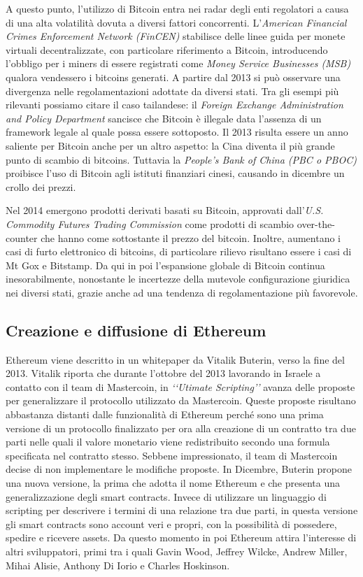 A questo punto, l'utilizzo di Bitcoin entra nei radar degli enti regolatori a causa di una alta volatilità dovuta a diversi fattori concorrenti. L'\textit{American Financial Crimes Enforcement Network (FinCEN)} stabilisce delle linee guida per monete virtuali decentralizzate, con particolare riferimento a Bitcoin, introducendo l'obbligo per i miners di essere registrati come \textit{Money Service Businesses (MSB)} qualora vendessero i bitcoins generati\cite{K17}. A partire dal 2013 si può osservare una divergenza nelle regolamentazioni adottate da diversi stati. 
Tra gli esempi più rilevanti possiamo citare il caso tailandese: il \textit{Foreign Exchange Administration and Policy Department} sancisce che Bitcoin è illegale data l'assenza di un framework legale al quale possa essere sottoposto\cite{K18}. Il 2013 risulta essere un anno saliente per Bitcoin anche per un altro aspetto: la Cina diventa il più grande punto di scambio di bitcoins. Tuttavia la \textit{People's Bank of China (PBC o PBOC)} proibisce l'uso di Bitcoin agli istituti finanziari cinesi, causando in dicembre un crollo dei prezzi\cite{K19}. 

Nel 2014 emergono prodotti derivati basati su Bitcoin, approvati dall'\textit{U.S. Commodity Futures Trading Commission} come prodotti di scambio over-the-counter che hanno come sottostante il prezzo del bitcoin. Inoltre, aumentano i casi di furto elettronico di bitcoins, di particolare rilievo risultano essere i casi di Mt Gox e Bitstamp. 
Da qui in poi l'espansione globale di Bitcoin continua inesorabilmente, nonostante le incertezze della mutevole configurazione giuridica nei diversi stati, grazie anche ad una tendenza di regolamentazione più favorevole.  

\subsection{Creazione e diffusione di Ethereum}

Ethereum viene descritto in un whitepaper\cite{K20} da Vitalik Buterin, verso la fine del 2013.
Vitalik riporta che durante l'ottobre del 2013 lavorando in Israele a contatto con il team di Mastercoin, in \textit{‘‘Utimate Scripting’’} avanza delle proposte per generalizzare il protocollo utilizzato da Mastercoin. Queste proposte risultano abbastanza distanti dalle funzionalità di Ethereum perché sono una prima versione di un protocollo finalizzato per ora alla creazione di un contratto tra due parti nelle quali il valore monetario viene redistribuito secondo una formula specificata nel contratto stesso. Sebbene impressionato, il team di Mastercoin decise di non implementare le modifiche proposte. In Dicembre, Buterin propone una nuova versione, la prima che adotta il nome Ethereum e che presenta una generalizzazione degli smart contracts. Invece di utilizzare un linguaggio di scripting per descrivere i termini di una relazione tra due parti, in questa versione gli smart contracts sono account veri e propri, con la possibilità di possedere, spedire e ricevere assets\cite{K21}. Da questo momento in poi Ethereum attira l'interesse di altri sviluppatori, primi tra i quali Gavin Wood, Jeffrey Wilcke, Andrew Miller, Mihai Alisie, Anthony Di Iorio e Charles Hoskinson. 

